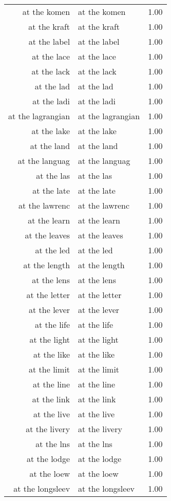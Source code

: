 \begin{table}[ht]
\begin{tabular}{rlr}
  at the komen & at the komen & 1.00 \\ 
  at the kraft & at the kraft & 1.00 \\ 
  at the label & at the label & 1.00 \\ 
  at the lace & at the lace & 1.00 \\ 
  at the lack & at the lack & 1.00 \\ 
  at the lad & at the lad & 1.00 \\ 
  at the ladi & at the ladi & 1.00 \\ 
  at the lagrangian & at the lagrangian & 1.00 \\ 
  at the lake & at the lake & 1.00 \\ 
  at the land & at the land & 1.00 \\ 
  at the languag & at the languag & 1.00 \\ 
  at the las & at the las & 1.00 \\ 
  at the late & at the late & 1.00 \\ 
  at the lawrenc & at the lawrenc & 1.00 \\ 
  at the learn & at the learn & 1.00 \\ 
  at the leaves & at the leaves & 1.00 \\ 
  at the led & at the led & 1.00 \\ 
  at the length & at the length & 1.00 \\ 
  at the lens & at the lens & 1.00 \\ 
  at the letter & at the letter & 1.00 \\ 
  at the lever & at the lever & 1.00 \\ 
  at the life & at the life & 1.00 \\ 
  at the light & at the light & 1.00 \\ 
  at the like & at the like & 1.00 \\ 
  at the limit & at the limit & 1.00 \\ 
  at the line & at the line & 1.00 \\ 
  at the link & at the link & 1.00 \\ 
  at the live & at the live & 1.00 \\ 
  at the livery & at the livery & 1.00 \\ 
  at the lns & at the lns & 1.00 \\ 
  at the lodge & at the lodge & 1.00 \\ 
  at the loew & at the loew & 1.00 \\ 
  at the longsleev & at the longsleev & 1.00 \\ 

\end{tabular}
\end{table}
